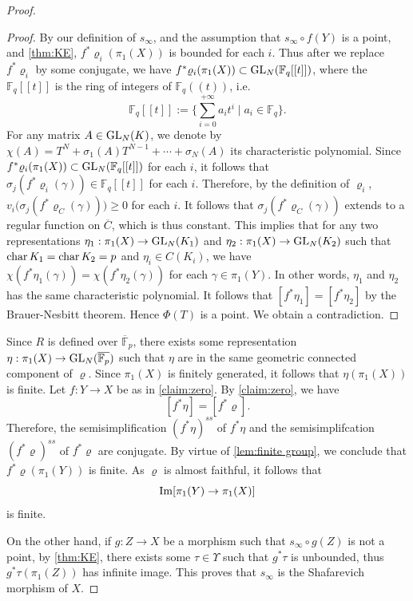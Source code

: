 \documentclass[english]{amsproc}
\theoremstyle{plain}
\theoremstyle{definition}
\theoremstyle{remark}
\theoremstyle{plain}
\numberwithin{equation}{thm} %
\newcommand{\bF}{\mathbb{F}}
\newcommand{\GL}{{\rm GL}}
\begin{document}
\begin{proof}
\begin{proof}
		By our definition of $s_\infty$, and the assumption that $s_\infty\circ f(Y)$ is a point, and \cref{thm:KE},    $f^*\varrho_i(\pi_1(X))$ is bounded for each $i$.
		Thus after we replace $f^*\varrho_i$ by some conjugate, we have $f^*\varrho_i(\pi_1(X))\subset \GL_{N}(\bF_q[[t]])$, where  the $\bF_q[[t]]$ is the ring of integers of $\bF_q((t))$, i.e.
		$$
		\bF_q[[t]]:=\{\sum_{i=0}^{+\infty}a_it^i\mid a_i\in \bF_q \}.
		$$ 
		For any matrix $A\in \GL_N(K)$,  we denote by $\chi(A)=T^N+\sigma_1(A)T^{N-1}+\cdots+\sigma_N(A)$ its characteristic polynomial.     
		Since  $f^*\varrho_i(\pi_1(X))\subset \GL_{N}(\bF_q[[t]])$ for each $i$, it follows that $\sigma_{j}(f^*\varrho_i(\gamma))\in \bF_q[[t]]$ for each $i$.  
		Therefore, by the definition of $\varrho_i$, $v_i\big(\sigma_j(f^*\varrho_C(\gamma))\big)\geq 0$ for each $i$.  It follows that $\sigma_j(f^*\varrho_C(\gamma))$  extends to a regular function on $\overline{C}$, which is thus constant.  
		This implies that for any  two representations $\eta_1:\pi_1(X)\to \GL_{N}(K_1)$ and $\eta_2:\pi_1(X)\to \GL_{N}(K_2)$  such that ${\rm char}\, K_1={\rm char}\, K_2=p$ and  $\eta_i\in C(K_i)$,  we have  $\chi(f^*\eta_1(\gamma))=\chi(f^*\eta_2(\gamma))$ for each $\gamma\in \pi_1(Y)$.  
		In other words, $\eta_1$ and $\eta_2$ has the same characteristic polynomial.  
		It follows that $[f^*\eta_1]=[f^*\eta_2]$ by the Brauer-Nesbitt theorem. 
		Hence $\Phi(T)$ is a point.    We obtain a contradiction. 
	\end{proof} 
	Since $R$ is defined over $\overline{\bF}_p$, there exists some representation  $\eta:\pi_1(X)\to \GL_{N}(\overline{\bF_p})$   such that $\eta$ are in the same geometric connected component of $\varrho$.   Since $\pi_1(X)$ is finitely generated, it follows that $\eta(\pi_1(X))$ is finite. Let $f:Y\to X$ be as in \cref{claim:zero}.  By  \cref{claim:zero}, we have 
	$$
	[f^*\eta]=[f^*\varrho]. 
	$$
	Therefore,   the semisimplification $(f^*\eta)^{ss}$  of $f^*\eta$ and the semisimplifcation $(f^*\varrho)^{ss}$ of $f^*\varrho$  are conjugate.  By virtue of \cref{lem:finite group},  we conclude that $f^*\varrho(\pi_1(Y))$ is finite.   As $\varrho$ is almost faithful, it follows that
	$$
	{\rm Im}[\pi_1(Y)\to \pi_1(X)]
	$$
	is finite. 
	
	On the other hand, if $g:Z\to X$ be a morphism such that $s_\infty\circ g(Z)$ is not a point, by \cref{thm:KE}, there exists some $\tau\in \Upsilon$ such that $g^*\tau$ is unbounded, thus $g^*\tau(\pi_1(Z))$ has infinite image.  This proves that $s_\infty$ is the Shafarevich morphism of $X$.  
\end{proof} 
\end{document}
